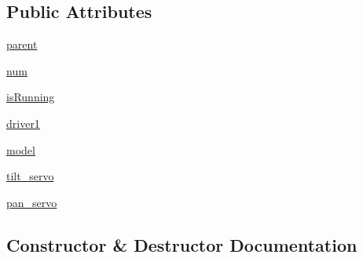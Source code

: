 \subsection*{Public Attributes}
\begin{DoxyCompactItemize}
\item 
\hyperlink{classcontroller_1_1PANTILT__CONTROLLER_1_1pantilt_afc2fa0a554c0d3ec465bf09d832fcf54}{parent}
\item 
\hyperlink{classcontroller_1_1PANTILT__CONTROLLER_1_1pantilt_a15cf83499c83b96b5eee02601919438f}{num}
\item 
\hyperlink{classcontroller_1_1PANTILT__CONTROLLER_1_1pantilt_a0e92951db4608e830b4b37616aa41096}{is\+Running}
\item 
\hyperlink{classcontroller_1_1PANTILT__CONTROLLER_1_1pantilt_af5635593bc5a63d45be083aa5e165a65}{driver1}
\item 
\hyperlink{classcontroller_1_1PANTILT__CONTROLLER_1_1pantilt_addf843595361a7270e1917354c8d41f2}{model}
\item 
\hyperlink{classcontroller_1_1PANTILT__CONTROLLER_1_1pantilt_a4b09a9cbf7fac18361ae3e9a772c7585}{tilt\+\_\+servo}
\item 
\hyperlink{classcontroller_1_1PANTILT__CONTROLLER_1_1pantilt_a384533b87bffe38df020ed6bfc992817}{pan\+\_\+servo}
\end{DoxyCompactItemize}


\subsection{Constructor \& Destructor Documentation}
\hypertarget{classcontroller_1_1PANTILT__CONTROLLER_1_1pantilt_a7de0de26f776775e5f1f4f165eabad5a}{}
